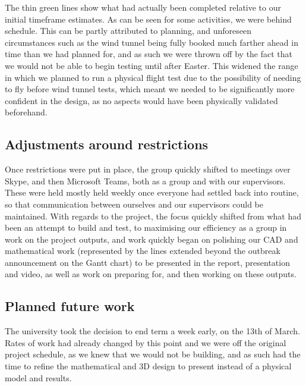 \documentclass[../../main.tex]{subfiles}
\begin{document}
The thin green lines show what had actually been completed relative to our initial timeframe estimates.
As can be seen for some activities, we were behind schedule.
This can be partly attributed to planning, and unforeseen circumstances such as the wind tunnel being fully booked much farther ahead in time than we had planned for, and as such we were thrown off by the fact that we would not be able to begin testing until after Easter.
This widened the range in which we planned to run a physical flight test due to the possibility of needing to fly before wind tunnel tests, which meant we needed to be significantly more confident in the design, as no aspects would have been physically validated beforehand. 

\subsection{Adjustments around restrictions} \label{sec:project-review:impact-of-covid-19:adjustments-around-restrictions}

Once restrictions were put in place, the group quickly shifted to meetings over Skype, and then Microsoft Teams, both as a group and with our supervisors.
These were held mostly held weekly once everyone had settled back into routine, so that communication between ourselves and our supervisors could be maintained.
With regards to the project, the focus quickly shifted from what had been an attempt to build and test, to maximising our efficiency as a group in work on the project outputs, and work quickly began on polishing our CAD and mathematical work (represented by the lines extended beyond the outbreak announcement on the Gantt chart) to be presented in the report, presentation and video, as well as work on preparing for, and then working on these outputs. 

\subsection{Planned future work} \label{sec:project-review:planned-future-work}

The university took the decision to end term a week early, on the 13th of March.
Rates of work had already changed by this point and we were off the original project schedule, as we knew that we would not be building, and as such had the time to refine the mathematical and 3D design to present instead of a physical model and results.  
\end{document}

